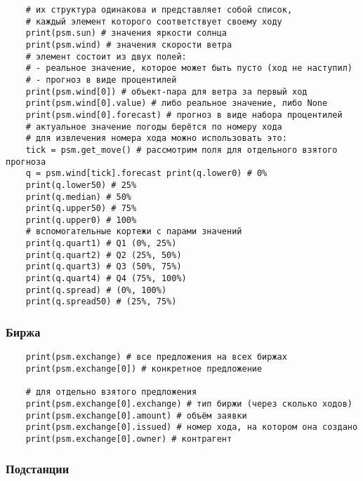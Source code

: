 \begin{verbatim}
    # их структура одинакова и представляет собой список, 
    # каждый элемент которого соответствует своему ходу 
    print(psm.sun) # значения яркости солнца 
    print(psm.wind) # значения скорости ветра 
    # элемент состоит из двух полей: 
    # - реальное значение, которое может быть пусто (ход не наступил) 
    # - прогноз в виде процентилей 
    print(psm.wind[0]) # объект-пара для ветра за первый ход 
    print(psm.wind[0].value) # либо реальное значение, либо None 
    print(psm.wind[0].forecast) # прогноз в виде набора процентилей 
    # актуальное значение погоды берётся по номеру хода 
    # для извлечения номера хода можно использовать это: 
    tick = psm.get_move() # рассмотрим поля для отдельного взятого прогноза 
    q = psm.wind[tick].forecast print(q.lower0) # 0% 
    print(q.lower50) # 25% 
    print(q.median) # 50% 
    print(q.upper50) # 75% 
    print(q.upper0) # 100%                                                       
    # вспомогательные кортежи с парами значений 
    print(q.quart1) # Q1 (0%, 25%) 
    print(q.quart2) # Q2 (25%, 50%) 
    print(q.quart3) # Q3 (50%, 75%) 
    print(q.quart4) # Q4 (75%, 100%) 
    print(q.spread) # (0%, 100%) 
    print(q.spread50) # (25%, 75%) 
\end{verbatim}

\subsubsection*{Биржа}

\begin{verbatim}
    print(psm.exchange) # все предложения на всех биржах 
    print(psm.exchange[0]) # конкретное предложение

    # для отдельно взятого предложения 
    print(psm.exchange[0].exchange) # тип биржи (через сколько ходов) 
    print(psm.exchange[0].amount) # объём заявки 
    print(psm.exchange[0].issued) # номер хода, на котором она создано 
    print(psm.exchange[0].owner) # контрагент 
\end{verbatim}

\subsubsection*{Подстанции}

